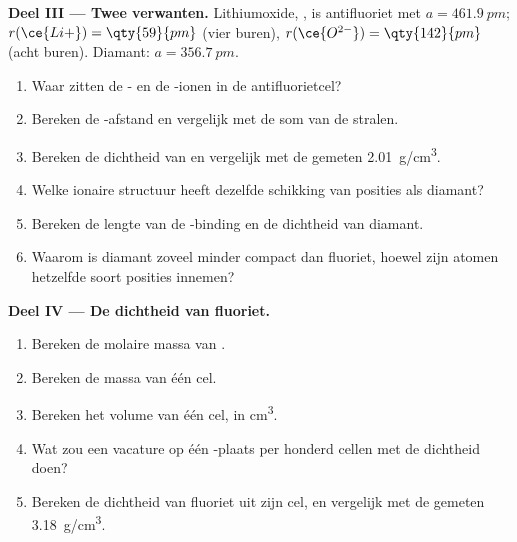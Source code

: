 \begin{problem}
\medskip
\noindent\textbf{Deel III --- Twee verwanten.}
Lithiumoxide, , is antifluoriet met $a = \qty{461.9}{pm}$;
$r(\ce{Li+}) = \qty{59}{pm}$ (vier buren), $r(\ce{O^{2-}}) =
\qty{142}{pm}$ (acht buren). Diamant: $a = \qty{356.7}{pm}$.
\begin{enumerate}[resume]
  \item Waar zitten de - en de -ionen in de
        antifluorietcel?
  \item Bereken de -afstand en vergelijk met de som van de
        stralen.
  \item Bereken de dichtheid van  en vergelijk met de gemeten
        \qty{2.01}{g/cm^3}.
  \item Welke ionaire structuur heeft dezelfde schikking van posities als
        diamant?
  \item Bereken de lengte van de -binding en de dichtheid van
        diamant.
  \item Waarom is diamant zoveel minder compact dan fluoriet, hoewel zijn
        atomen hetzelfde soort posities innemen?
\end{enumerate}

\medskip
\noindent\textbf{Deel IV --- De dichtheid van fluoriet.}
\begin{enumerate}[resume]
  \item Bereken de molaire massa van .
  \item Bereken de massa van één cel.
  \item Bereken het volume van één cel, in \unit{cm^3}.
  \item Wat zou een vacature op één -plaats per honderd cellen met
        de dichtheid doen?
  \item Bereken de dichtheid van fluoriet uit zijn cel, en vergelijk met de
        gemeten \qty{3.18}{g/cm^3}.
\end{enumerate}
\end{problem}
